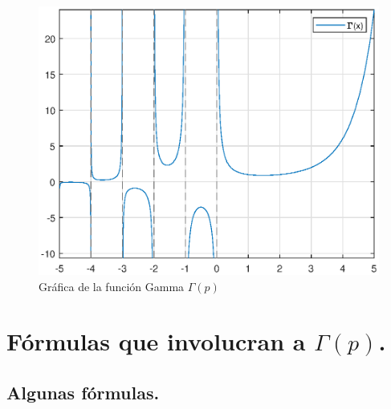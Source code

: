 \begin{figure}[H]
   \centering
   \includegraphics[scale=1]{Imagenes/Plot_Gamma.eps}
   \caption{Gráfica de la función Gamma $\Gamma (p)$}
   \label{fig:figura_plot_gamma}
\end{figure}

\section{Fórmulas que involucran a \texorpdfstring{$\Gamma (p)$}{G (p)}.}

\subsection{Algunas fórmulas.}

